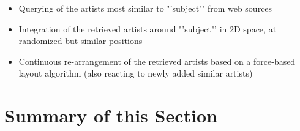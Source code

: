\begin{itemize}
	\item Querying of the artists most similar to "'subject"' from web sources
	\item Integration of the retrieved artists around "'subject"' in 2D space, at randomized but similar positions
	\item Continuous re-arrangement of the retrieved artists based on a force-based layout algorithm (also reacting to newly added similar artists)
\end{itemize}

\section{Summary of this Section}